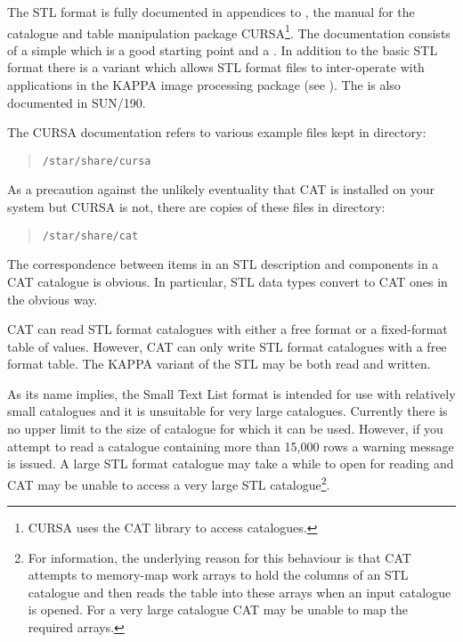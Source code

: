 The STL format is fully documented in appendices to
\cite{SUN190}, the manual for the catalogue and
table manipulation package CURSA\footnote{CURSA uses the CAT library to
access catalogues.}.  The documentation consists of a simple
 which is a good starting point and a
.  In addition to the basic STL
format there is a variant which allows STL format files to inter-operate
with applications in the KAPPA image processing package (see
\cite{SUN190}).  The
 is also documented in SUN/190.

The CURSA documentation refers to various example files kept in
directory:

\begin{verse}
{\tt /star/share/cursa}
\end{verse}

As a precaution against the unlikely eventuality that CAT is installed
on your system but CURSA is not, there are copies of these files in
directory:

\begin{verse}
{\tt /star/share/cat}
\end{verse}

The correspondence between items in an STL description and components
in a CAT catalogue is obvious.  In particular, STL data types convert
to CAT ones in the obvious way.

CAT can read STL format catalogues with either a free format or a
fixed-format table of values.  However, CAT can only write STL format
catalogues with a free format table.  The KAPPA variant of the STL may be
both read and written.

As its name implies, the Small Text List format is intended for use
with relatively small catalogues and it is unsuitable for very large
catalogues.  Currently there is no upper limit to the size of catalogue
for which it can be used.  However, if you attempt to read a catalogue
containing more than 15,000 rows a warning message is issued.  A large STL
format catalogue may take a while to open for reading and CAT may be
unable to access a very large STL catalogue\footnote{For
information, the underlying reason for this behaviour is that CAT
attempts to memory-map work arrays to hold the columns of an STL
catalogue and then reads the table into these arrays when an input
catalogue is opened.  For a very large catalogue CAT may be unable to
map the required arrays.}.

